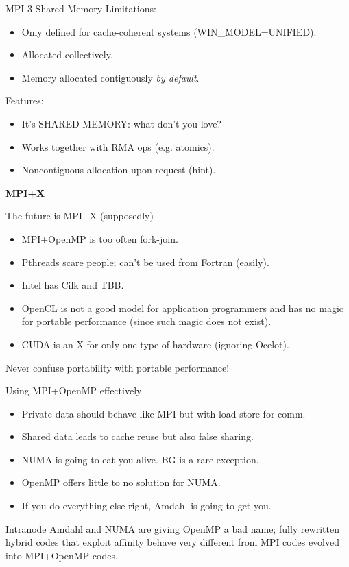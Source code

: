 \documentclass[11pt]{beamer}
\begin{document}
\begin{frame}{MPI-3 Shared Memory}\Large
    Limitations: \\
    \begin{itemize}
        \item Only defined for cache-coherent systems (WIN\_MODEL=UNIFIED).
        \item Allocated collectively.
        \item Memory allocated contiguously \textit{by default}.
    \end{itemize}
    Features: \\
    \begin{itemize}
        \item It's SHARED MEMORY: what don't you love?
        \item Works together with RMA ops (e.g. atomics).
        \item Noncontiguous allocation upon request (hint).
    \end{itemize}
\end{frame}

\begin{frame}{} \LARGE
  \begin{center}
      \textbf{MPI+X}
  \end{center}
\end{frame}

\begin{frame}[fragile]{The future is MPI+X (supposedly)} \large
\begin{itemize}
	\item MPI+OpenMP is too often fork-join.
	\item Pthreads scare people; can't be used from Fortran (easily).
	\item Intel has Cilk and TBB.
	\item OpenCL is not a good model for application programmers
          and has no magic for portable performance (since such magic does not exist).
	\item CUDA is an X for only one type of hardware (ignoring Ocelot).
\end{itemize}
Never confuse portability with portable performance!
\end{frame}

\begin{frame}{Using MPI+OpenMP effectively} \Large 
\begin{itemize}
	\item Private data should behave like MPI but with load-store for comm.
	\item Shared data leads to cache reuse but also false sharing.
	\item NUMA is going to eat you alive.  BG is a rare exception.
	\item OpenMP offers little to no solution for NUMA.
	\item If you do everything else right, Amdahl is going to get you.
\end{itemize}
Intranode Amdahl and NUMA are giving OpenMP a bad name;
fully rewritten hybrid codes that exploit affinity behave very different
from MPI codes evolved into MPI+OpenMP codes.
\end{frame}
\end{document}
